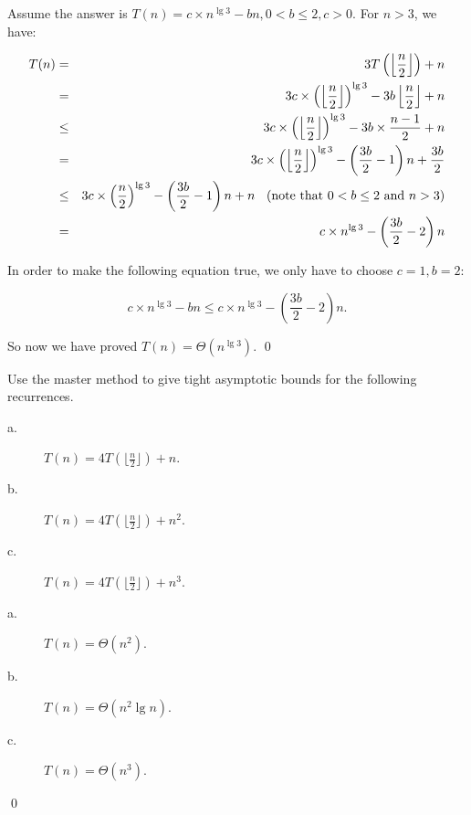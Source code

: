 \answer

Assume the answer is $T(n) = c\times n^{\lg3} - bn, 0 < b \leq 2, c > 0$. For $n > 3$, we have:

\begin{eqnarray*}
T(n) &=& 3T\left(\left\lfloor\frac{n}{2}\right\rfloor\right) + n\\
&=& 3c\times\left(\left\lfloor\frac{n}{2}\right\rfloor\right)^{\lg3} - 3b\left\lfloor \frac{n}{2}\right\rfloor + n\\
&\leq& 3c\times\left(\left\lfloor\frac{n}{2}\right\rfloor\right)^{\lg3} - 3b\times \frac{n -1}{2} + n\\
&=& 3c\times\left(\left\lfloor\frac{n}{2}\right\rfloor\right)^{\lg3} - \left(\frac{3b}{2} - 1\right)n + \frac{3b}{2}\\
&\leq& 3c \times \left(\frac{n}{2}\right)^{\lg3} - \left(\frac{3b}{2}- 1\right)n + n \text{\hspace{9pt}(note that $0 < b \leq 2$ and $n > 3$)}\\
&=& c\times n^{\lg3} - \left(\frac{3b}{2} - 2\right)n
\end{eqnarray*}

In order to make the following equation true, we only have to choose $c = 1, b = 2$:

$$c\times n^{\lg3} - bn \leq c\times n^{\lg3} - \left(\frac{3b}{2} - 2\right)n.$$

So now we have proved $T(n) = \Theta(n^{\lg 3}).$
\qed


Use the master method to give tight asymptotic bounds for the following recurrences.

\begin{description}
\item[a. \hspace{9pt}] $T(n) = 4T(\lfloor\frac{n}{2}\rfloor) + n$.
\item[b. \hspace{9pt}] $T(n) = 4T(\lfloor\frac{n}{2}\rfloor) + n ^ 2$.
\item[c. \hspace{9pt}] $T(n) = 4T(\lfloor\frac{n}{2}\rfloor) + n ^ 3$.
\end{description}

\answer

\begin{description}
\item[a.\hspace{9pt}] $T(n) = \Theta(n^2)$.
\item[b.\hspace{9pt}] $T(n) = \Theta(n^2\lg n)$.
\item[c.\hspace{9pt}] $T(n) = \Theta(n^3)$.
\end{description}
\qed

